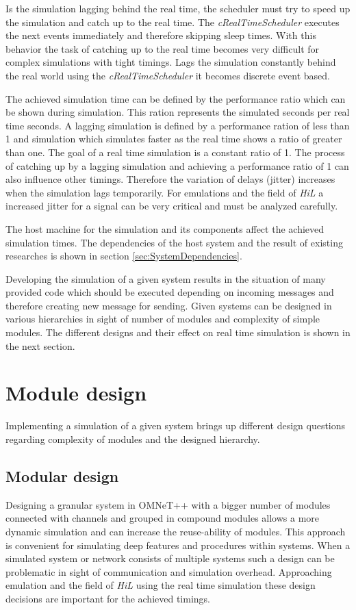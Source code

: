 \documentclass[journal]{IEEEtran}
\begin{document}
Is the simulation lagging behind the real time, the scheduler must try to speed up the simulation and catch up to the real time.
The \emph{cRealTimeScheduler} executes the next events immediately and therefore skipping sleep times.
With this behavior the task of catching up to the real time becomes very difficult for complex simulations with tight timings.
Lags the simulation constantly behind the real world using the \emph{cRealTimeScheduler} it becomes discrete event based.

The achieved simulation time can be defined by the performance ratio which can be shown during simulation.
This ration represents the simulated seconds per real time seconds.
A lagging simulation is defined by a performance ration of less than 1 and simulation which simulates faster as the real time shows a ratio of greater than one.
The goal of a real time simulation is a constant ratio of 1.
The process of catching up by a lagging simulation and achieving a performance ratio of 1 can also influence other timings.
Therefore the variation of delays (jitter) increases when the simulation lags temporarily.
For emulations and the field of \emph{HiL} a increased jitter for a signal can be very critical and must be analyzed carefully.

The host machine for the simulation and its components affect the achieved simulation times.
The dependencies of the host system and the result of existing researches is shown in section \ref{sec:SystemDependencies}.

Developing the simulation of a given system results in the situation of many provided code which should be executed depending on incoming messages and therefore creating new message for sending.
Given systems can be designed in various hierarchies in sight of number of modules and complexity of simple modules.
The different designs and their effect on real time simulation is shown in the next section.

\section{Module design}
\label{sec:ModuleDesign}
Implementing a simulation of a given system brings up different design questions regarding complexity of modules and the designed hierarchy.

\subsection{Modular design}
Designing a granular system in OMNeT++ with a bigger number of modules connected with channels and grouped in compound modules allows a more dynamic simulation and can increase the reuse-ability of modules.
This approach is convenient for simulating deep features and procedures within systems.
When a simulated system or network consists of multiple systems such a design can be problematic in sight of communication and simulation overhead.
Approaching emulation and the field of \emph{HiL} using the real time simulation these design decisions are important for the achieved timings.
\end{document}
